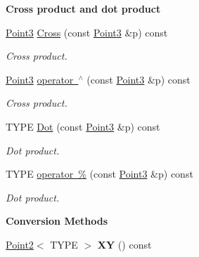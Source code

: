 \begin{Indent}\textbf{ Cross product and dot product}\par
\begin{DoxyCompactItemize}
\item 
\mbox{\label{classcy_1_1_point3_ae8238e78cef08e8cfc7630f2e4295575}} 
\mbox{\hyperlink{classcy_1_1_point3}{Point3}} \mbox{\hyperlink{classcy_1_1_point3_ae8238e78cef08e8cfc7630f2e4295575}{Cross}} (const \mbox{\hyperlink{classcy_1_1_point3}{Point3}} \&p) const
\begin{DoxyCompactList}\small\item\em Cross product. \end{DoxyCompactList}\item 
\mbox{\label{classcy_1_1_point3_a8d79ee2ef4847812e02b078b364ba37a}} 
\mbox{\hyperlink{classcy_1_1_point3}{Point3}} \mbox{\hyperlink{classcy_1_1_point3_a8d79ee2ef4847812e02b078b364ba37a}{operator $^\wedge$}} (const \mbox{\hyperlink{classcy_1_1_point3}{Point3}} \&p) const
\begin{DoxyCompactList}\small\item\em Cross product. \end{DoxyCompactList}\item 
\mbox{\label{classcy_1_1_point3_a50dcac0b4f703bd56c0165e5b2ae0d63}} 
T\+Y\+PE \mbox{\hyperlink{classcy_1_1_point3_a50dcac0b4f703bd56c0165e5b2ae0d63}{Dot}} (const \mbox{\hyperlink{classcy_1_1_point3}{Point3}} \&p) const
\begin{DoxyCompactList}\small\item\em Dot product. \end{DoxyCompactList}\item 
\mbox{\label{classcy_1_1_point3_a94e2fc1ec478d0e120fe9b623a7efd41}} 
T\+Y\+PE \mbox{\hyperlink{classcy_1_1_point3_a94e2fc1ec478d0e120fe9b623a7efd41}{operator \%}} (const \mbox{\hyperlink{classcy_1_1_point3}{Point3}} \&p) const
\begin{DoxyCompactList}\small\item\em Dot product. \end{DoxyCompactList}\end{DoxyCompactItemize}
\end{Indent}
\begin{Indent}\textbf{ Conversion Methods}\par
\begin{DoxyCompactItemize}
\item 
\mbox{\label{classcy_1_1_point3_a83710b66132f61aa7521872e5389e9fd}} 
\mbox{\hyperlink{classcy_1_1_point2}{Point2}}$<$ T\+Y\+PE $>$ {\bfseries XY} () const
\end{DoxyCompactItemize}
\end{Indent}
